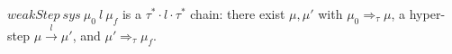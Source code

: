 \begin{definition}
  \label{def:weakstep}
  \leanok
  $weakStep\ sys\ \mu_0\ l\ \mu_f$ is a $\tau^\ast\!\cdot l\cdot\tau^\ast$ chain:
  there exist $\mu, \mu'$ with $\mu_0 \Rightarrow_\tau \mu$, a hyper-step
  $\mu \xrightarrow{l} \mu'$, and $\mu' \Rightarrow_\tau \mu_f$.
\end{definition}
